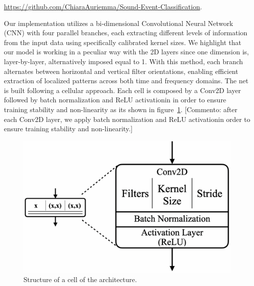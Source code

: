\documentclass{article}
\begin{document}
\begin{sloppy}
\url{https://github.com/ChiaraAuriemma/Sound-Event-Classification}.


Our implementation utilizes a bi-dimensional Convolutional Neural Network (CNN)
with four parallel branches, each extracting different levels of information from the
input data using specifically calibrated kernel sizes. 
We highlight that our model is working in a peculiar way with the 2D layers since one dimension is, layer-by-layer, alternatively
imposed equal to 1. With this method, each branch alternates between horizontal and vertical filter orientations,
enabling efficient extraction of localized patterns across both time and frequency domains.
The net is built following a cellular approach. Each cell is composed by a Conv2D layer followed by batch normalization and
ReLU activationin in order to ensure training stability and non-linearity as its shown in figure~\ref{fig:simple_cell}.
[Commento: after each Conv2D layer, we apply batch normalization and ReLU activationin order to ensure training stability and non-linearity.]
\begin{figure}[ht]
  \centering
  \centerline{\includegraphics[width=\columnwidth]{simple_cell.png}}
  \caption{Structure of a cell of the architecture.}
  \label{fig:simple_cell}
\end{figure}


\end{sloppy}
\end{document}
